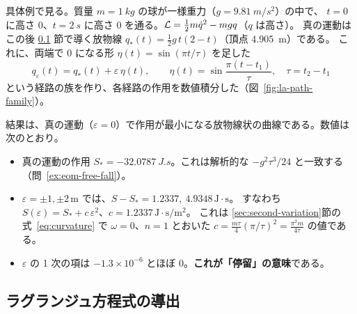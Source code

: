 具体例で見る。質量 $m=\qty{1}{kg}$ の球が一様重力（$g=\qty{9.81}{m/s^2}$）の中で、
$t=0$ に高さ 0、$t=\qty{2}{s}$ に高さ 0 を通る。$\mathcal{L}=\tfrac12m\dot q^2-mgq$（$q$ は高さ）。
真の運動はこの後 \ref{sec:el} 節で導く放物線 $q_*(t)=\tfrac12g\,t(2-t)$（頂点 \qty{4.905}{m}）である。
これに、両端で 0 になる形 $\eta(t)=\sin(\pi t/\tau)$ を足した
\begin{equation}
  q_\varepsilon(t)=q_*(t)+\varepsilon\,\eta(t),\qquad \eta(t)=\sin\frac{\pi(t-t_1)}{\tau},\quad \tau=t_2-t_1
  \label{eq:family}
\end{equation}
という経路の族を作り、各経路の作用を数値積分した（図~\ref{fig:la-path-family}）。


結果は、真の運動（$\varepsilon=0$）で作用が最小になる放物線状の曲線である。数値は次のとおり。
\begin{itemize}
  \item 真の運動の作用 $S_*=\qty{-32.0787}{J.s}$。これは解析的な $-g^2\tau^3/24$ と一致する（問~\ref{ex:eom-free-fall}）。
  \item $\varepsilon=\pm1,\pm2\,\mathrm{m}$ では、$S-S_*=1.2337,\ 4.9348\,\mathrm{J{\cdot}s}$。
    すなわち $S(\varepsilon)=S_*+c\,\varepsilon^2$、$c=1.2337\,\mathrm{J{\cdot}s/m^2}$。
    これは \ref{sec:second-variation}節の式~\eqref{eq:curvature} で $\omega=0$、$n=1$ とおいた
    $c=\tfrac{m\tau}{4}(\pi/\tau)^2=\tfrac{\pi^2m}{4\tau}$ の値である。
  \item $\varepsilon$ の 1 次の項は $-1.3\times10^{-6}$ とほぼ 0。\textbf{これが「停留」の意味}である。
\end{itemize}

\subsection{ラグランジュ方程式の導出}\label{sec:el}

